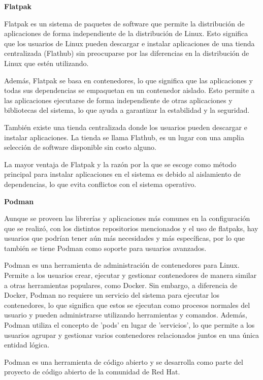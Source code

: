 \begin{spacing}{1.5}
  \textbf{Flatpak}

  Flatpak es un sistema de paquetes de software que permite la distribución
  de aplicaciones de forma independiente de la distribución de Linux. Esto
  significa que los usuarios de Linux pueden descargar e instalar aplicaciones de
  una tienda centralizada (Flathub) sin preocuparse por las diferencias en la
  distribución de Linux que estén utilizando.

  Además, Flatpak se basa en contenedores, lo que significa que las
  aplicaciones y todas sus dependencias se empaquetan en un contenedor aislado.
  Esto permite a las aplicaciones ejecutarse de forma independiente de otras
  aplicaciones y bibliotecas del sistema, lo que ayuda a garantizar la
  estabilidad y la seguridad.

  También existe una tienda centralizada donde los usuarios pueden descargar
  e instalar aplicaciones. La tienda se llama Flathub, es un lugar con una amplia
  selección de software disponible sin costo alguno.

  La mayor ventaja de Flatpak y la razón por la que se escoge como método
  principal para instalar aplicaciones en el sistema es debido al aislamiento de
  dependencias, lo que evita conflictos con el sistema operativo. \cite{FLAT-1}
  \cite{FLAT-2} \cite{RHEL-FLAT-1} \cite{PHOENIX-FLAT-1}

  \textbf{Podman}

  Aunque se proveen las librerías y aplicaciones más comunes en la
  configuración que se realizó, con los distintos repositorios mencionados y el
  uso de flatpaks, hay usuarios que podrían tener aún más necesidades y más
  específicas, por lo que también se tiene Podman como soporte para usuarios
  avanzados.

  Podman es una herramienta de administración de contenedores para Linux.
  Permite a los usuarios crear, ejecutar y gestionar contenedores de manera
  similar a otras herramientas populares, como Docker. Sin embargo, a diferencia
  de Docker, Podman no requiere un servicio del sistema para ejecutar los
  contenedores, lo que significa que estos se ejecutan como procesos normales del
  usuario y pueden administrarse utilizando herramientas y comandos. Además,
  Podman utiliza el concepto de 'pods' en lugar de 'servicios', lo que permite a
  los usuarios agrupar y gestionar varios contenedores relacionados juntos en una
  única entidad lógica.

  Podman es una herramienta de código abierto y se desarrolla como parte del
  proyecto de código abierto de la comunidad de Red Hat. \cite{RHEL-podman-1}


\end{spacing}

